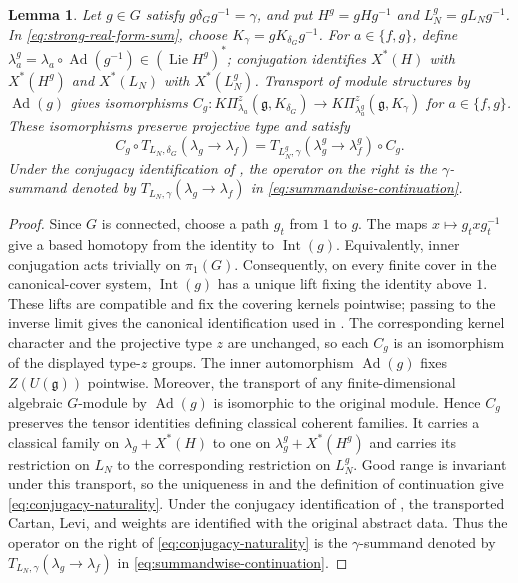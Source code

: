 \documentclass[10pt]{amsart}
\numberwithin{equation}{section}
\theoremstyle{plain}
\newtheorem{lemma}[proposition]{Lemma}
\theoremstyle{definition}
\theoremstyle{remark}
\newcommand{\fg}{\mathfrak g}
\begin{document}
\begin{lemma}\label{lem:conjugacy-naturality}
Let $g\in G$ satisfy $g\delta_Gg^{-1}=\gamma$, and put
$H^g=gHg^{-1}$ and $L_N^g=gL_Ng^{-1}$.
In \eqref{eq:strong-real-form-sum}, choose
$K_\gamma=gK_{\delta_G}g^{-1}$.
For $a\in\{f,g\}$, define
$\lambda_a^g=\lambda_a\circ\operatorname{Ad}(g^{-1})\in
(\operatorname{Lie}H^g)^*$; conjugation identifies
$X^*(H)$ with $X^*(H^g)$ and $X^*(L_N)$ with $X^*(L_N^g)$.
Transport of module structures by $\operatorname{Ad}(g)$ gives isomorphisms
$C_g:K\Pi_{\lambda_a}^z(\fg,K_{\delta_G})\to
K\Pi_{\lambda_a^g}^z(\fg,K_\gamma)$ for $a\in\{f,g\}$.
These isomorphisms preserve projective type and satisfy
\begin{equation}\label{eq:conjugacy-naturality}
 C_g\circ T_{L_N,\delta_G}(\lambda_g\to\lambda_f)
 =
 T_{L_N^g,\gamma}(\lambda_g^g\to\lambda_f^g)\circ C_g.
\end{equation}
Under the conjugacy identification of
\cite[Definition~2.4.2]{AIMV26}, the operator on the right is the
$\gamma$-summand denoted by
$T_{L_N,\gamma}(\lambda_g\to\lambda_f)$ in
\eqref{eq:summandwise-continuation}.
\end{lemma}

\begin{proof}
Since $G$ is connected, choose a path $g_t$ from $1$ to $g$. The maps
$x\mapsto g_txg_t^{-1}$ give a based homotopy from the identity to
$\operatorname{Int}(g)$. Equivalently, inner conjugation acts trivially on
$\pi_1(G)$. Consequently, on every finite cover in the canonical-cover
system, $\operatorname{Int}(g)$ has a unique lift fixing the identity above
$1$. These lifts are compatible and fix the covering kernels pointwise;
passing to the inverse limit gives the canonical identification used in
\cite[Definitions~2.4.2--2.4.3]{AIMV26}. The corresponding kernel character
and the projective type $z$ are unchanged, so each $C_g$ is an isomorphism
of the displayed type-$z$ groups.
The inner automorphism $\operatorname{Ad}(g)$ fixes
$Z(U(\fg))$ pointwise. Moreover, the transport of any finite-dimensional
algebraic $G$-module by $\operatorname{Ad}(g)$ is isomorphic to the
original module. Hence $C_g$ preserves the tensor identities defining
classical coherent families. It carries a classical family on
$\lambda_g+X^*(H)$ to one on
$\lambda_g^g+X^*(H^g)$ and carries its restriction on $L_N$ to the
corresponding restriction on $L_N^g$. Good range is invariant under this
transport, so the uniqueness in
\cite[Proposition~2.10.2]{AIMV26} and the definition of continuation give
\eqref{eq:conjugacy-naturality}.
Under the conjugacy identification of
\cite[Definition~2.4.2]{AIMV26}, the transported Cartan, Levi, and weights
are identified with the original abstract data. Thus the operator on the
right of \eqref{eq:conjugacy-naturality} is the $\gamma$-summand
denoted by $T_{L_N,\gamma}(\lambda_g\to\lambda_f)$ in
\eqref{eq:summandwise-continuation}.
\end{proof}
\end{document}

